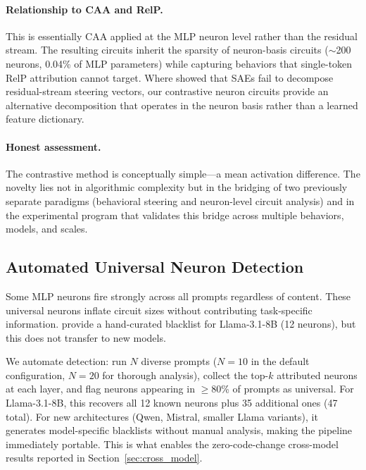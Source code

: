 \documentclass[11pt]{article}
\begin{document}
\paragraph{Relationship to CAA and RelP.}
This is essentially CAA applied at the MLP neuron level rather than the residual stream.
The resulting circuits inherit the sparsity of neuron-basis circuits (${\sim}$200 neurons, 0.04\% of MLP parameters) while capturing behaviors that single-token RelP attribution cannot target.
Where \citet{mayne2024sae_steering} showed that SAEs fail to decompose residual-stream steering vectors, our contrastive neuron circuits provide an alternative decomposition that operates in the neuron basis rather than a learned feature dictionary.

\paragraph{Honest assessment.}
The contrastive method is conceptually simple---a mean activation difference.
The novelty lies not in algorithmic complexity but in the bridging of two previously separate paradigms (behavioral steering and neuron-level circuit analysis) and in the experimental program that validates this bridge across multiple behaviors, models, and scales.

\subsection{Automated Universal Neuron Detection}
\label{sec:blacklist}

Some MLP neurons fire strongly across all prompts regardless of content.
These universal neurons inflate circuit sizes without contributing task-specific information.
\citet{arora2025circuits} provide a hand-curated blacklist for Llama-3.1-8B (12 neurons), but this does not transfer to new models.

We automate detection: run $N$ diverse prompts ($N{=}10$ in the default configuration, $N{=}20$ for thorough analysis), collect the top-$k$ attributed neurons at each layer, and flag neurons appearing in $\geq$80\% of prompts as universal.
For Llama-3.1-8B, this recovers all 12 known neurons plus 35 additional ones (47 total).
For new architectures (Qwen, Mistral, smaller Llama variants), it generates model-specific blacklists without manual analysis, making the pipeline immediately portable.
This is what enables the zero-code-change cross-model results reported in Section~\ref{sec:cross_model}.
\end{document}

